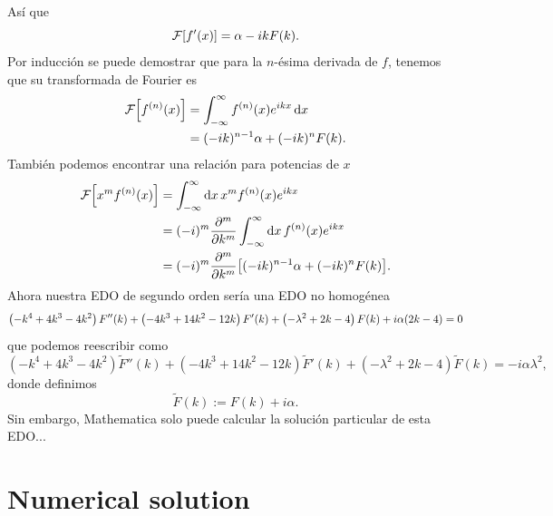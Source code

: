 \documentclass[%
 aip,
 jmp,%
 amsmath,amssymb,
 reprint,%
]{revtex4-2}
\begin{document}
As\'i que
\begin{equation*}
     \mathcal{F}\qty[f'(x)] = \alpha - ikF(k).
\end{equation*}
Por inducci\'on se puede demostrar que para la $n$-\'esima derivada de $f$, tenemos que su transformada de Fourier es
\begin{equation*}
\begin{aligned}
    \mathcal{F}\qty[f^{(n)}(x)] &= \int_{-\infty}^\infty f^{(n)}(x)e^{ikx}\dd{x}\\
    &= (-ik)^{n-1}\alpha + (-ik)^{n}F(k).
\end{aligned}
\end{equation*}
Tambi\'en podemos encontrar una relaci\'on para potencias de $x$
\begin{equation*}
\begin{aligned}
    \mathcal{F}\qty[x^mf^{(n)}(x)] &= \int_{-\infty}^\infty \dd{x} x^mf^{(n)}(x)e^{ikx}\\
    &= (-i)^m\pdv[m]{k}\int_{-\infty}^\infty \dd{x} f^{(n)}(x)e^{ikx}\\
    &= (-i)^{m}\pdv[m]{k}\qty[(-ik)^{n-1}\alpha + (-ik)^{n}F(k)].
\end{aligned}
\end{equation*}
Ahora nuestra EDO de segundo orden ser\'ia una EDO no homogénea
\begin{equation}
     \left(-k^4+4 k^3-4 k^2\right) F''(k)+\left(-4 k^3+14 k^2-12 k\right) F'(k)+ \left(-\lambda ^2+2 k-4\right)F(k) +i\alpha\qty(2k - 4) =0
\end{equation}
que podemos reescribir como
\begin{equation}
     \left(-k^4+4 k^3-4 k^2\right) \widetilde{F}''(k)+\left(-4 k^3+14 k^2-12 k\right)\widetilde{F}'(k)+ \left(-\lambda ^2+2 k-4\right)\widetilde{F}(k)= - i\alpha\lambda^2 ,
\end{equation}
donde definimos
\begin{equation*}
    \widetilde{F}(k) := F(k) + i\alpha.
\end{equation*}
Sin embargo, Mathematica solo puede calcular la soluci\'on particular de esta EDO...



\section{Numerical solution}
\end{document}
